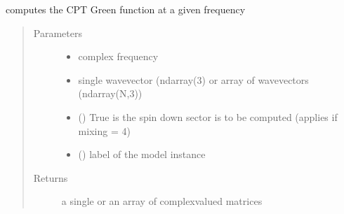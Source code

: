 \documentclass[letterpaper,10pt,english]{sphinxmanual}
\begin{document}
\begin{fulllineitems}
\label{\detokenize{functions:pyqcm.CPT_Green_function}}
\sphinxAtStartPar
computes the CPT Green function at a given frequency
\begin{quote}\begin{description}
\item[{Parameters}] \leavevmode\begin{itemize}
\item {} 
\sphinxAtStartPar
{} \textendash{} complex frequency

\item {} 
\sphinxAtStartPar
{} \textendash{} single wavevector (ndarray(3) or array of wavevectors (ndarray(N,3))

\item {} 
\sphinxAtStartPar
{} () \textendash{} True is the spin down sector is to be computed (applies if mixing = 4)

\item {} 
\sphinxAtStartPar
{} () \textendash{} label of the model instance

\end{itemize}

\item[{Returns}] \leavevmode
\sphinxAtStartPar
a single or an array of complex\sphinxhyphen{}valued matrices

\end{description}\end{quote}

\end{fulllineitems}

\end{document}
